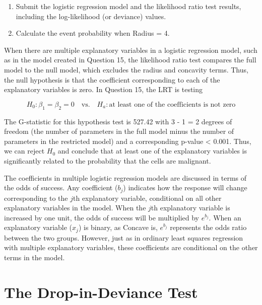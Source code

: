 \documentclass[
]{book}
\providecommand{\tightlist}{%
  \setlength{\itemsep}{0pt}\setlength{\parskip}{0pt}}
\begin{document}
\begin{enumerate}
\def\labelenumi{\alph{enumi}.}
\tightlist
\item
  Submit the logistic regression model and the likelihood ratio test results, including the log-likelihood (or deviance) values.\\
\item
  Calculate the event probability when Radius = 4.
\end{enumerate}

When there are multiple explanatory variables in a logistic regression model, such as in the model created in Question 15, the likelihood ratio test compares the full model to the null model, which excludes the radius and concavity terms. Thus, the null hypothesis is that the coefficient corresponding to each of the explanatory variables is zero. In Question 15, the LRT is testing

\[H_0: \beta_1 = \beta_2 = 0 \quad \text{vs.}\quad H_a: \text{at least one of the coefficients is not zero}\]

The G-statistic for this hypothesis test is 527.42 with 3 - 1 = 2 degrees of freedom (the number of parameters in the full model minus the number of parameters in the restricted model) and a corresponding p-value \textless{} 0.001. Thus, we can reject \(H_0\) and conclude that at least one of the explanatory variables is significantly related to the probability that the cells are malignant.

The coefficients in multiple logistic regression models are discussed in terms of the odds of success. Any coefficient (\(b_j\)) indicates how the response will change corresponding to the \(j\)th explanatory variable, conditional on all other explanatory variables in the model. When the \(j\)th explanatory variable is increased by one unit, the odds of success will be multiplied by \(e^{b_j}\). When an explanatory variable (\(x_j\)) is binary, as Concave is, \(e^{b_j}\) represents the odds ratio between the two groups. However, just as in ordinary least squares regression with multiple explanatory variables, these coefficients are conditional on the other terms in the model.

\hypertarget{the-drop-in-deviance-test}{%
\section{The Drop-in-Deviance Test}\label{the-drop-in-deviance-test}}
\end{document}
